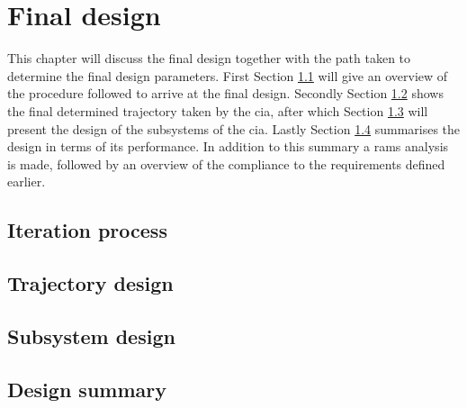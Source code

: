\section{Final design}\label{cha:finaldesign}
This chapter will discuss the final design together with the path taken to determine the final design parameters. First Section \ref{sec:iterationprocess} will give an overview of the procedure followed to arrive at the final design. Secondly Section \ref{sec:trajectorydesign} shows the final determined trajectory taken by the \gls{cia}, after which Section \ref{sec:subsystemdesign} will present the design of the subsystems of the \gls{cia}. Lastly Section \ref{sec:designsummary} summarises the design in terms of its performance. In addition to this summary a \gls{rams} analysis is made, followed by an overview of the compliance to the requirements defined earlier.

\subsection{Iteration process} \label{sec:iterationprocess}


\subsection{Trajectory design} \label{sec:trajectorydesign}


\subsection{Subsystem design} \label{sec:subsystemdesign}


\subsection{Design summary} \label{sec:designsummary}

